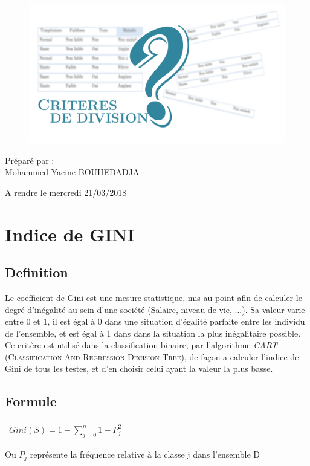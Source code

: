 \documentclass[a4paper, 11pt]{report}
\begin{document}
\begin{figure}
\begin{center}
\includegraphics[scale=3]{critere2}
\end{center}
\end{figure}



 Préparé par : \\
 Mohammed Yacine BOUHEDADJA


\noindent \begin{center}
A rendre le mercredi 21/03/2018
\end{center}

\newpage
\tableofcontents

\chapter{Indice de GINI}

\section{Definition}
Le coefficient de Gini est une mesure statistique, mis au point afin de calculer le degré d'inégalité au sein d'une société (Salaire, niveau de vie, ...). Sa valeur varie entre 0 et 1, il est égal à 0 dans une situation d'égalité parfaite entre les individu de l'ensemble, et est égal à 1 dans dans la situation la plus inégalitaire possible.\\
Ce critère est utilisé dans la classification binaire, par l'algorithme \emph{CART} (\textsc{Classification And Regression Decision Tree)}, de façon a calculer l'indice de Gini de tous les testes, et d'en choisir celui ayant la valeur la plus basse.

\section{Formule}
\begin{center}
\begin{tabular}{| c |}
\hline
$Gini(S) = 1-\sum\limits_{j=0}^n 1- P_j^2$\\
\hline
\end{tabular}
\end{center}
Ou $P_j$ représente la fréquence relative à la classe j dans l'ensemble D
\end{document}
